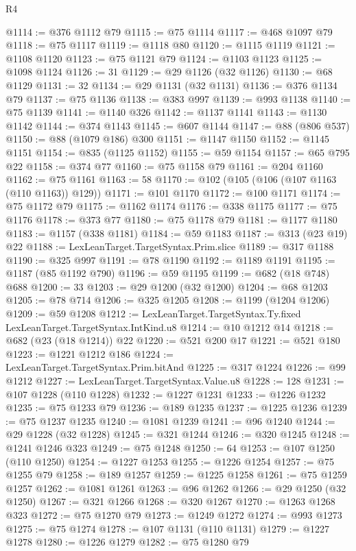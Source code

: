 \begin{lexlean}{R4}
\begin{coremodule}
{{{{{{{{{{{{{{{{{{{{{{{{{{{{{{{{{{{{{{{{{{{{{{{{{{{{{{{{{{{{{{{{{{{{{{{{{{{{{{{{{{{{{{{{{{{{@1114 := @376 @1112 @79
@1115 := @75 @1114
@1117 := @468 @1097 @79
@1118 := @75 @1117
@1119 := @1118 @80
@1120 := @1115 @1119
@1121 := @1108 @1120
@1123 := @75 @1121 @79
@1124 := @1103 @1123
@1125 := @1098 @1124
@1126 := 31
@1129 := @29 @1126 (@32 @1126)
@1130 := @68 @1129
@1131 := 32
@1134 := @29 @1131 (@32 @1131)
@1136 := @376 @1134 @79
@1137 := @75 @1136
@1138 := @383 @997
@1139 := @993 @1138
@1140 := @75 @1139
@1141 := @1140 @326
@1142 := @1137 @1141
@1143 := @1130 @1142
@1144 := @374 @1143
@1145 := @607 @1144
@1147 := @88 (@806 @537)
@1150 := @88 (@1079 @186) @300
@1151 := @1147 @1150
@1152 := @1145 @1151
@1154 := @835 (@1125 @1152)
@1155 := @59 @1154
@1157 := @65 @795 @22
@1158 := @374 @77
@1160 := @75 @1158 @79
@1161 := @204 @1160
@1162 := @75 @1161
@1163 := 58
@1170 := @102 (@105 (@106 (@107 @1163 (@110 @1163)) @129))
@1171 := @101 @1170
@1172 := @100 @1171
@1174 := @75 @1172 @79
@1175 := @1162 @1174
@1176 := @338 @1175
@1177 := @75 @1176
@1178 := @373 @77
@1180 := @75 @1178 @79
@1181 := @1177 @1180
@1183 := @1157 (@338 @1181)
@1184 := @59 @1183
@1187 := @313 (@23 @19) @22
@1188 := LexLeanTarget.TargetSyntax.Prim.slice
@1189 := @317 @1188
@1190 := @325 @997
@1191 := @78 @1190
@1192 := @1189 @1191
@1195 := @1187 (@85 @1192 @790)
@1196 := @59 @1195
@1199 := @682 (@18 @748) @688
@1200 := 33
@1203 := @29 @1200 (@32 @1200)
@1204 := @68 @1203
@1205 := @78 @714
@1206 := @325 @1205
@1208 := @1199 (@1204 @1206)
@1209 := @59 @1208
@1212 := LexLeanTarget.TargetSyntax.Ty.fixed LexLeanTarget.TargetSyntax.IntKind.u8
@1214 := @10 @1212 @14
@1218 := @682 (@23 (@18 @1214)) @22
@1220 := @521 @200 @17
@1221 := @521 @180
@1223 := @1221 @1212 @186
@1224 := LexLeanTarget.TargetSyntax.Prim.bitAnd
@1225 := @317 @1224
@1226 := @99 @1212
@1227 := LexLeanTarget.TargetSyntax.Value.u8
@1228 := 128
@1231 := @107 @1228 (@110 @1228)
@1232 := @1227 @1231
@1233 := @1226 @1232
@1235 := @75 @1233 @79
@1236 := @189 @1235
@1237 := @1225 @1236
@1239 := @75 @1237 @1235
@1240 := @1081 @1239
@1241 := @96 @1240
@1244 := @29 @1228 (@32 @1228)
@1245 := @321 @1244
@1246 := @320 @1245
@1248 := @1241 @1246 @323
@1249 := @75 @1248
@1250 := 64
@1253 := @107 @1250 (@110 @1250)
@1254 := @1227 @1253
@1255 := @1226 @1254
@1257 := @75 @1255 @79
@1258 := @189 @1257
@1259 := @1225 @1258
@1261 := @75 @1259 @1257
@1262 := @1081 @1261
@1263 := @96 @1262
@1266 := @29 @1250 (@32 @1250)
@1267 := @321 @1266
@1268 := @320 @1267
@1270 := @1263 @1268 @323
@1272 := @75 @1270 @79
@1273 := @1249 @1272
@1274 := @993 @1273
@1275 := @75 @1274
@1278 := @107 @1131 (@110 @1131)
@1279 := @1227 @1278
@1280 := @1226 @1279
@1282 := @75 @1280 @79
}}}}}}}}}}}}}}}}}}}}}}}}}}}}}}}}}}}}}}}}}}}}}}}}}}}}}}}}}}}}}}}}}}}}}}}}}}}}}}}}}}}}}}}}}}}}
\end{coremodule}
\end{lexlean}
